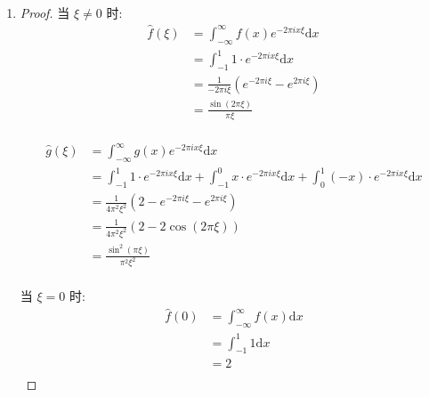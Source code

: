 \documentclass{article}
\begin{document}
\begin{enumerate}
\begin{proof}
    \end{proof}
    \item \begin{proof}
        当 $\xi\neq0$ 时:
        \begin{equation}
            \begin{aligned}
                \hat{f}(\xi)
                &=\int_{-\infty}^{\infty}f(x)e^{-2\pi ix\xi}\mathrm{d}x \\
                &=\int_{-1}^{1}1\cdot e^{-2\pi ix\xi}\mathrm{d}x \\
                &=\frac{1}{-2\pi i\xi}\left(e^{-2\pi i\xi}-e^{2\pi i\xi}\right) \\
                &=\frac{\sin(2\pi\xi)}{\pi\xi} \\
            \end{aligned}
            \nonumber
        \end{equation} \par
        \begin{equation}
            \begin{aligned}
                \hat{g}(\xi)
                &=\int_{-\infty}^{\infty}g(x)e^{-2\pi ix\xi}\mathrm{d}x \\
                &=\int_{-1}^{1}1\cdot e^{-2\pi ix\xi}\mathrm{d}x+\int_{-1}^{0}x\cdot e^{-2\pi ix\xi}\mathrm{d}x+\int_{0}^{1}(-x)\cdot e^{-2\pi ix\xi}\mathrm{d}x \\
                &=\frac{1}{4\pi^2\xi^2}\left(2-e^{-2\pi i\xi}-e^{2\pi i\xi}\right) \\
                &=\frac{1}{4\pi^2\xi^2}\left(2-2\cos(2\pi\xi)\right) \\
                &=\frac{\sin^2(\pi\xi)}{\pi^2\xi^2} \\
            \end{aligned}
            \nonumber
        \end{equation} \par
        当 $\xi=0$ 时:
        \begin{equation}
            \begin{aligned}
                \hat{f}(0)
                &=\int_{-\infty}^{\infty}f(x)\mathrm{d}x \\
                &=\int_{-1}^{1}1\mathrm{d}x \\
                &=2 \\
            \end{aligned}
            \nonumber
        \end{equation} \par

\end{proof}
\end{enumerate}
\end{document}
